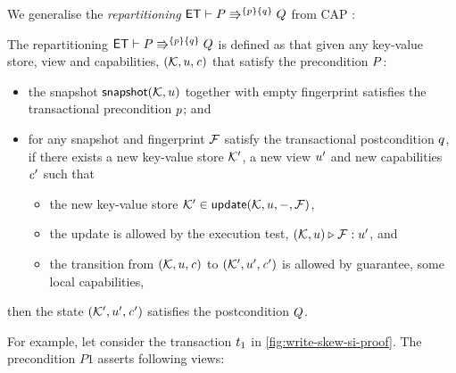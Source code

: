 We generalise the \emph{repartitioning} \( \mathsf{ET} \vdash P \Rrightarrow^{ \left\{ p \right\} \left\{ q \right\} } Q \) from CAP \cite{cap}:
\begin{definition}[Repartitioning]
The repartitioning  \( \mathsf{ET} \vdash P \Rrightarrow^{ \left\{ p \right\} \left\{ q \right\} } Q \) is defined as that 
given any key-value store, view and capabilities, \( (\mathcal{K}, u, \mathit{c}) \) that satisfy the precondition \( P \):
\begin{itemize}
    \item the snapshot \( \snapshot(\mkvs,\vi) \) together with empty fingerprint satisfies the transactional precondition \( p \); and
    \item for any snapshot and fingerprint \( \mathcal{F} \) satisfy the transactional postcondition \( q \), if
        there exists a new key-value store \( \mathcal{K}' \), a new view \( u' \) and new capabilities \( \mathit{c}' \) such that 
    \begin{itemize}
        \item the new key-value store \( \mkvs' \in \updateKV(\mkvs, \vi, \stub, \fp) \),
        \item the update is allowed by the execution test, \ie \( (\mathcal{K}, u) \triangleright_{} \mathcal{F} : u' \), and
        \item the transition from \( (\mathcal{K}, u, \mathit{c}) \) to \( (\mathcal{K}', u', \mathit{c}') \) is allowed by guarantee, \ie some local capabilities,
    \end{itemize} 
\end{itemize}
then the state \( (\mathcal{K}', u', \mathit{c}') \) satisfies the postcondition \( Q \).
\end{definition}

For example,  let consider the transaction \( t_1 \) in \cref{fig:write-skew-si-proof}.
The precondition \( P1 \) asserts following views:





